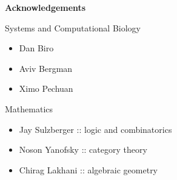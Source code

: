 \begin{frame}
\textbf{Acknowledgements}
\begin{block}{Systems and Computational Biology}
\begin{small}
\begin{itemize}
\item Dan Biro
\item Aviv Bergman
\item Ximo Pechuan
\end{itemize}
\end{small}
\end{block}
\begin{block}{Mathematics}
\begin{small}
\begin{itemize}
\item Jay Sulzberger :: logic and combinatorics
\item Noson Yanofsky :: category theory
\item Chirag Lakhani :: algebraic geometry
\end{itemize}
\end{small}
\end{block}
\end{frame}
